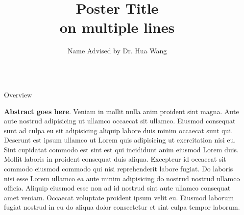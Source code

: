 \documentclass[final]{beamer}
\title{Poster Title \\[0.5in] on multiple lines} %
\author{Name Advised by Dr. Hua Wang} %
\institute{Computer Science Department\\Colorado School of Mines} %
\newlength{\sepwid}
\newlength{\onecolwid}
\begin{document}
    
    
    \setlength{\belowcaptionskip}{2ex} %
    \setlength\belowdisplayshortskip{2ex} %
    
    \begin{frame}[t] %
    
    \begin{columns}[t] %
    
    \begin{column}{\sepwid}\end{column} %
    
    \begin{column}{\onecolwid} %
    
        

        \begin{alertblock}{Overview}
        
            \textbf{Abstract goes here}. Veniam in mollit nulla anim proident sint magna. Aute aute nostrud adipisicing ut ullamco occaecat sit ullamco. Eiusmod consequat sunt ad culpa eu sit adipisicing aliquip labore duis minim occaecat sunt qui. Deserunt est ipsum ullamco ut Lorem quis adipisicing ut exercitation nisi eu.
            Sint cupidatat commodo est sint est qui incididunt anim eiusmod Lorem duis. Mollit laboris in proident consequat duis aliqua. Excepteur id occaecat sit commodo eiusmod commodo qui nisi reprehenderit labore fugiat. Do laboris nisi esse Lorem ullamco ea aute minim adipisicing do nostrud nostrud ullamco officia. Aliquip eiusmod esse non ad id nostrud sint aute ullamco consequat amet veniam. Occaecat voluptate proident ipsum velit eu. Eiusmod laborum fugiat nostrud in eu do aliqua dolor consectetur et sint culpa tempor laborum.
        

\end{alertblock}
\end{column}
\end{columns}
\end{frame}
\end{document}
